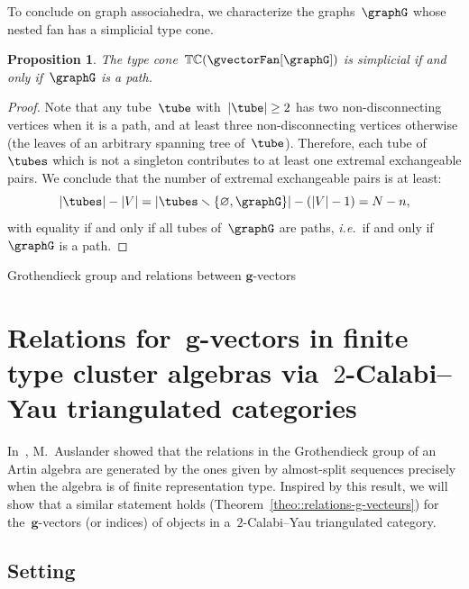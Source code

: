 \documentclass{amsart}
\makeatletter
\newtheorem{proposition}[theorem]{Proposition}
\theoremstyle{definition}
\renewcommand{\b}[1]{{\boldsymbol{#1}}} %
\newcommand{\ssm}{\smallsetminus} %
\newcommand{\ie}{\textit{i.e.}~} %
\newcommand{\typeCone}{\mathbb{TC}} %
\def\part{\@startsection{part}{1}%
\z@{.7\linespacing\@plus\linespacing}{.8\linespacing}%
{\LARGE\sffamily\centering}}
\makeatother
\begin{document}
To conclude on graph associahedra, we characterize the graphs~$\graphG$ whose nested fan has a simplicial type cone.

\begin{proposition}
The type cone~$\typeCone(\gvectorFan[\graphG])$ is simplicial if and only if~$\graphG$ is a path.
\end{proposition}

\begin{proof}
Note that any tube~$\tube$ with~$|\tube| \ge 2$ has two non-disconnecting vertices when it is a path, and at least three non-disconnecting vertices otherwise (the leaves of an arbitrary spanning tree of~$\tube$).
Therefore, each tube of~$\tubes$ which is not a singleton contributes to at least one extremal exchangeable pairs.
We conclude that the number of extremal exchangeable pairs is at least:
\[
|\tubes| - |V| = |\tubes \ssm \{\varnothing, \graphG\}| - (|V|-1) = N - n,
\]
with equality if and only if all tubes of~$\graphG$ are paths, \ie if and only if~$\graphG$ is a path.
\end{proof}



\newpage
\part{Grothendieck group and relations between $\b{g}$-vectors}
\label{part:algebra}


\section{Relations for~$\b{g}$-vectors in finite type cluster algebras via~$2$-Calabi--Yau triangulated categories}
\label{sec:clusterCategories}

In~\cite{Auslander1984}, M.~Auslander showed that the relations in the Grothendieck group of an Artin algebra are generated by the ones given by almost-split sequences precisely when the algebra is of finite representation type.  Inspired by this result, we will show that a similar statement holds (Theorem~\ref{theo::relations-g-vecteurs}) for the~$\b g$-vectors (or indices) of objects in a~$2$-Calabi--Yau triangulated category. 


\subsection{Setting}
\label{sect::setting}
\end{document}
